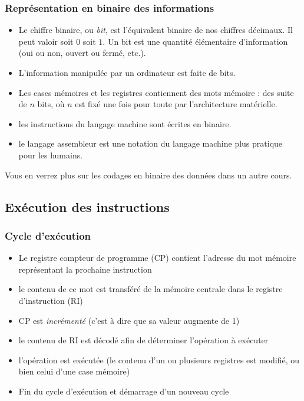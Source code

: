 \documentclass[xcolor=svgnames]{beamer}
\begin{document}
\begin{frame}
  \frametitle{Représentation en binaire des informations}
  \begin{definition}[bit]
    \begin{itemize}
    \item Le chiffre binaire, ou \emph{bit}, est l'équivalent binaire
      de nos chiffres décimaux. Il peut valoir soit $0$ soit $1$. Un
      bit est une \alert{quantité élémentaire d'information} (oui ou non,
      ouvert ou fermé, etc.).\pause
    \item L'information manipulée par un ordinateur est faite de
      bits.\pause
\item Les cases mémoires et les registres contiennent des \alert{mots mémoire}
  : des suite de $n$ bits, où $n$ est fixé une fois pour toute par
  l'architecture matérielle.\pause
\item les instructions du langage machine sont écrites en binaire.\pause
\item   le \alert{langage assembleur} est une notation du langage
  machine plus pratique pour les humains.
   \end{itemize}
  \end{definition}
\pause Vous en verrez plus sur les codages en binaire des données
dans un autre cours.
\end{frame}

\subsection{Exécution des instructions}
\begin{frame}
  \frametitle{Cycle d'exécution\nowrite}
\pause
\begin{itemize}
  \item Le registre \alert{compteur de programme} (CP) contient l'adresse du mot mémoire
    représentant la prochaine instruction\pause
\item le contenu de ce mot est transféré de la mémoire centrale dans
  le \alert{registre d'instruction} (RI)\pause
\item CP est \emph{incrémenté} (c'est à dire que sa valeur augmente de 1)\pause
\item le contenu de RI est décodé afin de déterminer l'opération à
  exécuter\pause
\item l'opération est exécutée (le contenu d'un ou plusieurs
  registres est modifié, ou bien celui d'une case mémoire)\pause
\item Fin du cycle d'exécution et démarrage d'un nouveau cycle
\end{itemize}
\end{frame}
\end{document}
